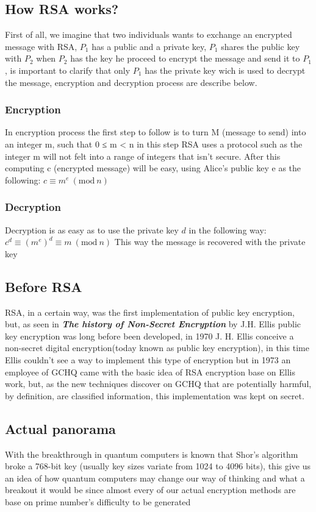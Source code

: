 \documentclass[conference,compsoc, 10pt]{IEEEtran}
\newcommand{\Mod}[1]{\ (\mathrm{mod}\ #1)}
\begin{document}
\subsection{How RSA works?}
First of all, we imagine that two individuals wants to exchange an encrypted message with RSA, $P_{1}$ has a public and a private key, $P_{1}$ shares the public key with $P_{2}$ when $P_{2}$ has the key he proceed to encrypt the message and send it to $P_{1}$, is important to clarify that only $P_{1}$ has the private key wich is used to decrypt the message, encryption and decryption process are describe below.  
\subsubsection{Encryption}
In encryption process the first step to follow is to turn M (message to send) into an integer m, such that 0 ≤ m < n in this step RSA uses a protocol such as the integer m will not felt into a range of integers that isn't secure. After this computing c (encrypted message) will be easy, using Alice's public key e as the following:
$c \equiv m^e \Mod{n}$
\subsubsection{Decryption}
Decryption is as easy as to use the private key $d$ in the following way:\newline
$c^d \equiv (m^e)^d \equiv m \Mod{n}$\newline
This way the message is recovered with the private key

\subsection{Before RSA}
RSA, in a certain way, was the first implementation of public key encryption, but, as seen in \textbf{\textit{The history of Non-Secret Encryption}} by J.H. Ellis public key encryption was long before been developed, in 1970 J. H. Ellis conceive a non-secret digital encryption(today known as public key encryption), in this time Ellis couldn't see a way to implement this type of encryption but in 1973 an employee of GCHQ came with the basic idea of RSA encryption base on Ellis work, but, as the new techniques discover on GCHQ that are potentially harmful, by definition, are classified information, this implementation was kept on secret.

\subsection{Actual panorama}
With the breakthrough in quantum computers is known that Shor's algorithm broke a 768-bit key (usually key sizes variate from 1024 to 4096 bits), this give us an idea of how quantum computers may change our way of thinking and what a breakout it would be since almost every of our actual encryption methods are base on prime number's difficulty to be generated
\end{document}
